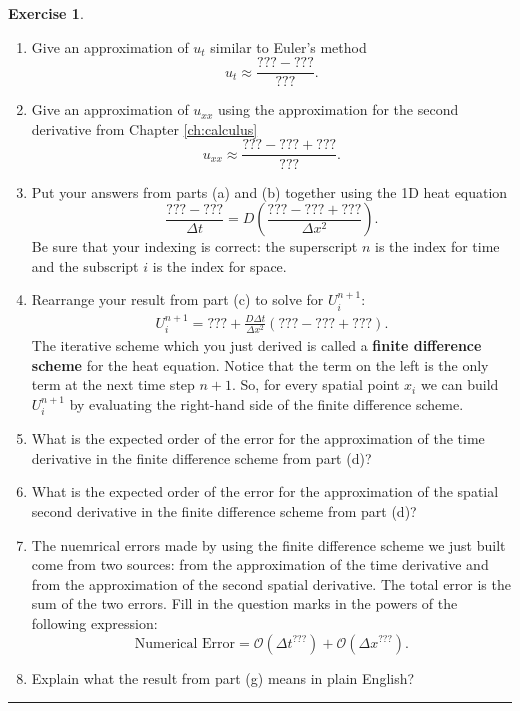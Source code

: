 \documentclass[
]{book}
\providecommand{\tightlist}{%
  \setlength{\itemsep}{0pt}\setlength{\parskip}{0pt}}
\theoremstyle{definition}
\theoremstyle{definition}
\theoremstyle{definition}
\newtheorem{exercise}{Exercise}[chapter]
\theoremstyle{remark}
\begin{document}
\begin{exercise}
\begin{enumerate}
\def\labelenumi{\alph{enumi}.}
\tightlist
\item
  Give an approximation of \(u_t\) similar to Euler's method
  \[ u_t \approx \frac{??? - ???}{???}. \]
\item
  Give an approximation of \(u_{xx}\) using the approximation for the second derivative from Chapter \ref{ch:calculus}
  \[ u_{xx} \approx \frac{??? - ??? + ???}{???}. \]
\item
  Put your answers from parts (a) and (b) together using the 1D heat equation
  \[\frac{??? - ???}{\Delta t} = D \left( \frac{??? - ??? + ???}{\Delta x^2} \right).\]
  Be sure that your indexing is correct: the superscript \(n\) is the index for time and the subscript \(i\) is the index for space.
\item
  Rearrange your result from part (c) to solve for \(U_i^{n+1}\):
  \[\begin{aligned}
       U_i^{n+1} = ??? + \frac{D \Delta t}{\Delta x^2} \left( ??? - ??? + ??? \right). 
  \end{aligned}\]
  The iterative scheme which you just derived is called a \textbf{finite difference scheme} for the heat equation. Notice that the term on the left is the only term at the next time step \(n+1\). So, for every spatial point \(x_i\) we can build \(U_i^{n+1}\) by evaluating the right-hand side of the finite difference scheme.
\item
  What is the expected order of the error for the approximation of the time derivative in the finite difference scheme from part (d)?
\item
  What is the expected order of the error for the approximation of the spatial second derivative in the finite difference scheme from part (d)?
\item
  The nuemrical errors made by using the finite difference scheme we just built come from two sources: from the approximation of the time derivative and from the approximation of the second spatial derivative. The total error is the sum of the two errors. Fill in the question marks in the powers of the following expression:
  \[ \text{Numerical Error} = \mathcal{O}(\Delta t^{???}) + \mathcal{O}(\Delta x^{???}). \]
\item
  Explain what the result from part (g) means in plain English?
\end{enumerate}
\end{exercise}

\begin{center}\rule{0.5\linewidth}{0.5pt}\end{center}
\end{document}

